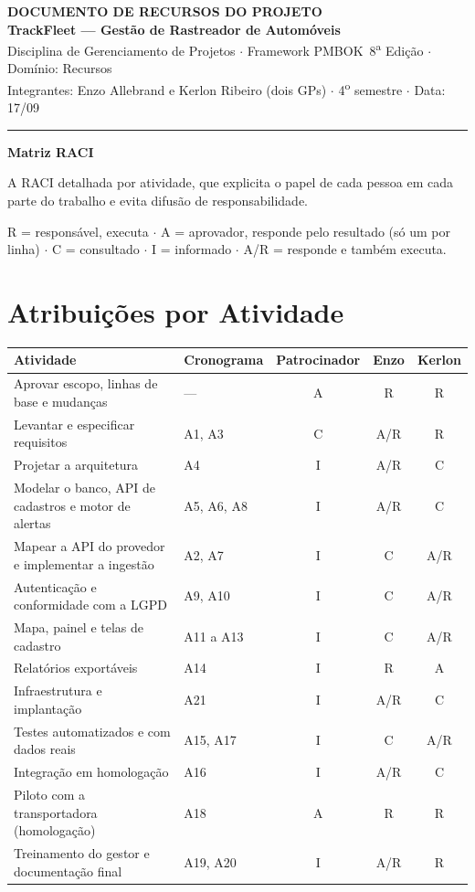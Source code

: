 \documentclass[11pt,a4paper]{article}
\newcommand{\cabecalho}[3]{%
  \begin{center}
  {\Large\bfseries DOCUMENTO DE #1 DO PROJETO}\\[2pt]
  {\large\bfseries TrackFleet --- Gestão de Rastreador de Automóveis}\\[4pt]
  Disciplina de Gerenciamento de Projetos $\cdot$ Framework PMBOK\textregistered\ 8\textsuperscript{a} Edição $\cdot$ Domínio: #2\\[2pt]
  Integrantes: Enzo Allebrand e Kerlon Ribeiro (dois GPs) $\cdot$ 4\textsuperscript{o} semestre $\cdot$ Data: #3
  \end{center}
  \vspace{2mm}\hrule\vspace{4mm}}
\newcommand{\parte}[1]{\noindent\textbf{\large #1}\par\vspace{1mm}}
\begin{document}
\cabecalho{RECURSOS}{Recursos}{17/09}

\parte{Matriz RACI}
\noindent A RACI detalhada por atividade, que explicita o papel de cada pessoa em cada parte do trabalho e evita difusão de responsabilidade.

\noindent R = responsável, executa $\cdot$ A = aprovador, responde pelo resultado (só um por linha) $\cdot$ C = consultado $\cdot$ I = informado $\cdot$ A/R = responde e também executa.

\section{Atribuições por Atividade}

\begin{center}
\small
\begin{tabularx}{\textwidth}{L l c c c}
\toprule
\textbf{Atividade} & \textbf{Cronograma} & \textbf{Patrocinador} & \textbf{Enzo} & \textbf{Kerlon} \\
\midrule
Aprovar escopo, linhas de base e mudanças & --- & A & R & R \\
Levantar e especificar requisitos & A1, A3 & C & A/R & R \\
Projetar a arquitetura & A4 & I & A/R & C \\
Modelar o banco, API de cadastros e motor de alertas & A5, A6, A8 & I & A/R & C \\
Mapear a API do provedor e implementar a ingestão & A2, A7 & I & C & A/R \\
Autenticação e conformidade com a LGPD & A9, A10 & I & C & A/R \\
Mapa, painel e telas de cadastro & A11 a A13 & I & C & A/R \\
Relatórios exportáveis & A14 & I & R & A \\
Infraestrutura e implantação & A21 & I & A/R & C \\
Testes automatizados e com dados reais & A15, A17 & I & C & A/R \\
Integração em homologação & A16 & I & A/R & C \\
Piloto com a transportadora (homologação) & A18 & A & R & R \\
Treinamento do gestor e documentação final & A19, A20 & I & A/R & R \\
\bottomrule
\end{tabularx}
\end{center}
\end{document}
